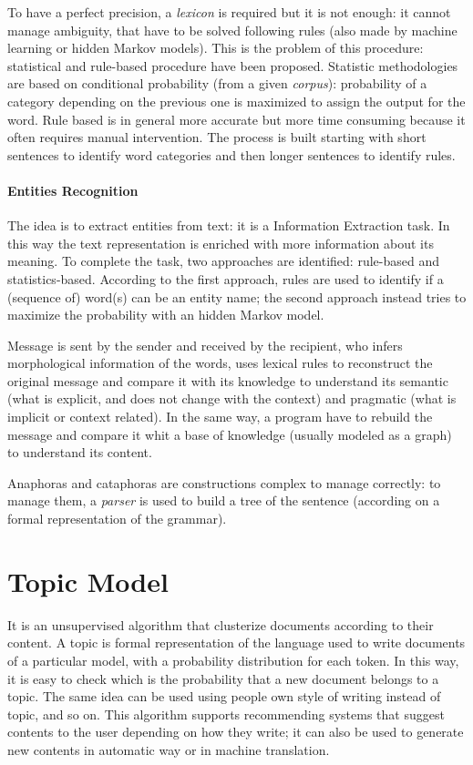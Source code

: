 \documentclass[11pt, a4page]{article}
\begin{document}
To have a perfect precision, a \textit{lexicon} is required but it is not enough: it cannot manage ambiguity, that have to be solved following rules (also made by machine learning or hidden Markov models).
This is the problem of this procedure: statistical and rule-based procedure have been proposed.
Statistic methodologies are based on conditional probability (from a given \textit{corpus}): probability of a category depending on the previous one is maximized to assign the output for the word.
Rule based is in general more accurate but more time consuming because it often requires manual intervention.
The process is built starting with short sentences to identify word categories and then longer sentences to identify rules.

\paragraph{Entities Recognition}
The idea is to extract entities from text: it is a Information Extraction task.
In this way the text representation is enriched with more information about its meaning.
To complete the task, two approaches are identified: rule-based and statistics-based.
According to the first approach, rules are used to identify if a (sequence of) word(s) can be an entity name; the second approach instead tries to maximize the probability with an hidden Markov model.
\newline

Message is sent by the sender and received by the recipient, who infers morphological information of the words, uses lexical rules to reconstruct the original message and compare it with its knowledge to understand its semantic (what is explicit, and does not change with the context) and pragmatic (what is implicit or context related).
In the same way, a program have to rebuild the message and compare it whit a base of knowledge (usually modeled as a graph) to understand its content.

Anaphoras and cataphoras are constructions complex to manage correctly: to manage them, a \textit{parser} is used to build a tree of the sentence (according on a formal representation of the grammar).

\section{Topic Model}
It is an unsupervised algorithm that clusterize documents according to their content.
A topic is formal representation of the language used to write documents of a particular model, with a probability distribution for each token.
In this way, it is easy to check which is the probability that a new document belongs to a topic.
The same idea can be used using people own style of writing instead of topic, and so on.
This algorithm supports recommending systems that suggest contents to the user depending on how they write; it can also be used to generate new contents in  automatic way or in machine translation.
\end{document}
